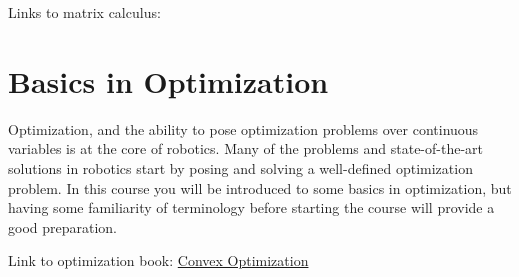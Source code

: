 \documentclass[11pt,letterpaper]{article}
\begin{document}
Links to matrix calculus: 

\section*{Basics in Optimization}

Optimization, and the ability to pose optimization problems over continuous variables is at the core of robotics. Many of the problems and state-of-the-art solutions in robotics start by posing and solving a well-defined optimization problem. In this course you will be introduced to some basics in optimization, but having some familiarity of terminology before starting the course will provide a good preparation. 

Link to optimization book: \href{https://web.stanford.edu/~boyd/cvxbook/bv_cvxbook.pdf}{Convex Optimization}
\end{document}
